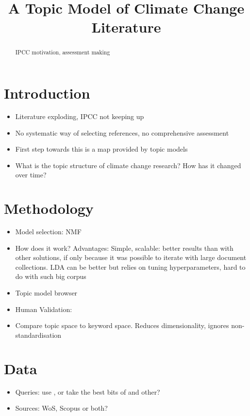 \documentclass{article}
\title{A Topic Model of Climate Change Literature}
\begin{document}
\maketitle
\begin{abstract}
IPCC motivation, assessment making
\end{abstract}

\section{Introduction}
\begin{itemize}
	\item Literature exploding, IPCC not keeping up \citep{minx2016learning}
    \item No systematic way of selecting references, no comprehensive assessment
    \item First step towards this is a map provided by topic models
    \item What is the topic structure of climate change research? How has it changed over time?
\end{itemize}

\section{Methodology}

\begin{itemize}
\item Model selection: NMF
\item How does it work? Advantages: Simple, scalable: better results than with other solutions, if only because it was possible to iterate with large document collections. LDA can be better but relies on tuning hyperparameters, hard to do with such big corpus
\item Topic model browser \citet{Chaney2012}
\item Human Validation: 
\item Compare topic space to keyword space. Reduces dimensionality, ignores non-standardisation

\end{itemize}

\section{Data}
\begin{itemize}
	\item Queries: use \citet{Grieneisen2011}, or take the best bits of \citet{Grieneisen2011} and other?
    \item Sources: WoS, Scopus or both?
\end{itemize}
\end{document}
